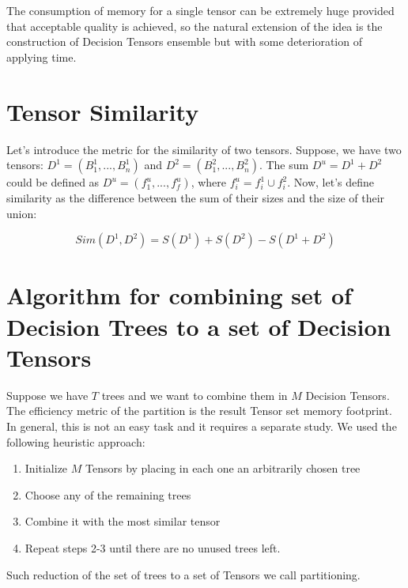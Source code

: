 \documentclass[a4paper]{jpconf}
\begin{document}
The consumption of memory for a single tensor can be extremely huge provided that acceptable quality is achieved, so the natural extension of the idea is the construction of Decision Tensors ensemble but with some deterioration of applying time.

\section{Tensor Similarity}
Let's introduce the metric for the similarity of two tensors. Suppose, we have two tensors: $D^1 = (B^{1}_{1}, ..., B^{1}_{n})$ and $D^2 = (B^{2}_{1}, ..., B^{2}_{n})$. The sum $D^u = D^1 + D^2$ could be defined as $D^u = (f^{u}_{1}, ..., f^{u}_{f})$, where $f^{u}_{i} = f^{1}_{i} \cup f^{2}_{i}$. Now, let's define similarity as the difference between the sum of their sizes and the size of their union:

$$Sim(D^1, D^2) = S(D^1) + S(D^2) - S(D^1 + D^2)$$




\section{Algorithm for combining set of Decision Trees to a set of Decision Tensors}

Suppose we have $T$ trees and we want to combine them in $M$ Decision Tensors. The efficiency metric of the partition is the result Tensor set memory footprint.
In general, this is not an easy task and it requires a separate study. We used the following heuristic approach:
\medskip
\renewcommand{\theenumi}{\arabic{enumi}}
\begin{enumerate}
\item Initialize $M$ Tensors by placing in each one an arbitrarily chosen tree
\item Choose any of the remaining trees
\item Combine it with the most similar tensor
\item Repeat steps 2-3 until there are no unused trees left.
\end{enumerate}
Such reduction of the set of trees to a set of Tensors we call partitioning.
\end{document}
